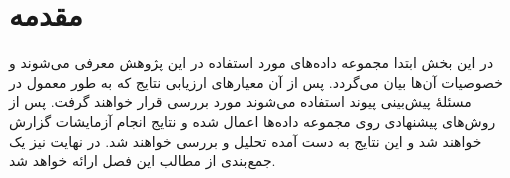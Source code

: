 \section{مقدمه}
در این بخش ابتدا مجموعه داده‌های مورد استفاده در این پژوهش معرفی می‌شوند و خصوصیات آن‌ها بیان می‌گردد. پس از آن معیارهای ارزیابی نتایج که به طور معمول در مسئلهٔ پیش‌بینی پیوند استفاده می‌شوند مورد بررسی قرار خواهند گرفت. پس از روش‌های پیشنهادی روی مجموعه داده‌ها اعمال شده و نتایج انجام آزمایشات گزارش خواهند شد و این نتایج به دست آمده تحلیل و بررسی خواهند شد. در نهایت نیز یک جمع‌بندی از مطالب این فصل ارائه خواهد شد.
\\[3cm]
